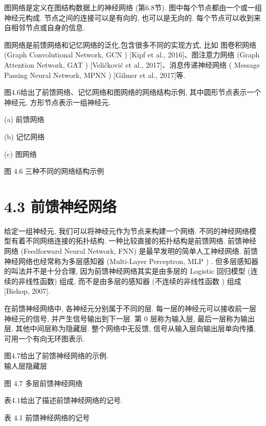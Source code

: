 \documentclass[10pt]{article}
\begin{document}
图网络是定义在图结构数据上的神经网络 (第6.8节). 图中每个节点都由一个或一组神经元构成. 节点之间的连接可以是有向的, 也可以是无向的. 每个节点可以收到来自相邻节点或自身的信息.

图网络是前馈网络和记忆网络的泛化,包含很多不同的实现方式, 比如 图卷积网络 (Graph Convolutional Network, GCN ) [Kipf et al., 2016]、图注意力网络 (Graph Attention Network, GAT ) [Veličković et al., 2017]、消息传递神经网络 ( Message Passing Neural Network, MPNN ) [Gilmer et al., 2017]等.

图4.6给出了前馈网络、记忆网络和图网络的网络结构示例, 其中圆形节点表示一个神经元, 方形节点表示一组神经元.



(a) 前馈网络



(b) 记忆网络



(c) 图网络

图 4.6 三种不同的网络结构示例

\section*{4.3 前馈神经网络}
给定一组神经元, 我们可以将神经元作为节点来构建一个网络. 不同的神经网络模型有着不同网络连接的拓扑结构. 一种比较直接的拓扑结构是前馈网络. 前馈神经网络 (Feedforward Neural Network, FNN) 是最早发明的简单人工神经网络. 前馈神经网络也经常称为多层感知器 (Multi-Layer Perceptron, MLP ) . 但多层感知器的叫法并不是十分合理, 因为前馈神经网络其实是由多层的 Logistic 回归模型 (连续的非线性函数) 组成, 而不是由多层的感知器 (不连续的非线性函数 ) 组成 [Bishop, 2007].

在前馈神经网络中, 各神经元分别属于不同的层. 每一层的神经元可以接收前一层神经元的信号, 并产生信号输出到下一层. 第 0 层称为输入层, 最后一层称为输出层, 其他中间层称为隐藏层. 整个网络中无反馈, 信号从输入层向输出层单向传播, 可用一个有向无环图表示.

图4.7给出了前馈神经网络的示例.\\
输人层隐藏层



图 4.7 多层前馈神经网络

表4.1给出了描述前馈神经网络的记号.

表 4.1 前馈神经网络的记号
\end{document}
